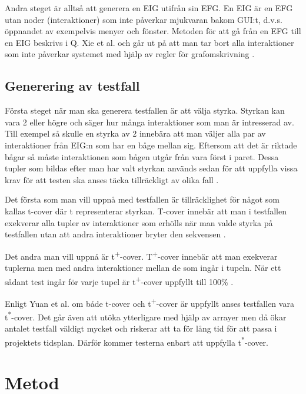 Andra steget är alltså att generera en EIG utifrån sin EFG. En EIG är en EFG utan noder (interaktioner) som inte påverkar mjukvaran bakom GUI:t, d.v.s. öppnandet av exempelvis menyer och fönster. Metoden för att gå från en EFG till en EIG beskrivs i Q. Xie et al. \cite{xie2008using} och går ut på att man tar bort alla interaktioner som inte påverkar systemet med hjälp av regler för grafomskrivning \cite{yuan2011gui}. 

\subsection{Generering av testfall}

Första steget när man ska generera testfallen är att välja styrka. Styrkan kan vara 2 eller högre och säger hur många interaktioner som man är intresserad av. Till exempel så skulle en styrka av 2 innebära att man väljer alla par av interaktioner från EIG:n som har en båge mellan sig. Eftersom att det är riktade bågar så måste interaktionen som bågen utgår från vara först i paret. Dessa tupler som bildas efter man har valt styrkan används sedan för att uppfylla vissa krav för att testen ska anses täcka tillräckligt av olika fall \cite{yuan2011gui}. 

Det första som man vill uppnå med testfallen är tillräcklighet för något som kallas t-cover där t representerar styrkan. T-cover innebär att man i testfallen exekverar alla tupler av interaktioner som erhölls när man valde styrka på testfallen utan att andra interaktioner bryter den sekvensen \cite{yuan2011gui}.

Det andra man vill uppnå är t\textsuperscript{+}-cover. T\textsuperscript{+}-cover innebär att man exekverar tuplerna men med andra interaktioner mellan de som ingår i tupeln. När ett sådant test ingår för varje tupel är t\textsuperscript{+}-cover uppfyllt till 100\% \cite{yuan2011gui}.

Enligt Yuan et al. \cite{yuan2011gui} om både t-cover och t\textsuperscript{+}-cover är uppfyllt anses testfallen vara t\textsuperscript{*}-cover. Det går även att utöka ytterligare med hjälp av arrayer men då ökar antalet testfall väldigt mycket och riskerar att ta för lång tid för att passa i projektets tidsplan. Därför kommer testerna enbart att uppfylla t\textsuperscript{*}-cover.

\section{Metod}
\label{sec:method-holmberg}

